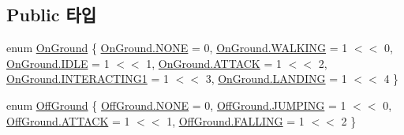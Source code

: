\subsection*{Public 타입}
\begin{DoxyCompactItemize}
\item 
enum \mbox{\hyperlink{class_state_ab9eb1c1d81f1903b8486d1275e78b68e}{On\+Ground}} \{ \newline
\mbox{\hyperlink{class_state_ab9eb1c1d81f1903b8486d1275e78b68eab50339a10e1de285ac99d4c3990b8693}{On\+Ground.\+N\+O\+NE}} = 0, 
\mbox{\hyperlink{class_state_ab9eb1c1d81f1903b8486d1275e78b68ea606c114184493a665cf1f6a12fbab9d3}{On\+Ground.\+W\+A\+L\+K\+I\+NG}} = 1 $<$$<$ 0, 
\mbox{\hyperlink{class_state_ab9eb1c1d81f1903b8486d1275e78b68eaa5daf7f2ebbba4975d61dab1c40188c7}{On\+Ground.\+I\+D\+LE}} = 1 $<$$<$ 1, 
\mbox{\hyperlink{class_state_ab9eb1c1d81f1903b8486d1275e78b68eac6ddd0f72ff2fd344693b9ca8d483871}{On\+Ground.\+A\+T\+T\+A\+CK}} = 1 $<$$<$ 2, 
\newline
\mbox{\hyperlink{class_state_ab9eb1c1d81f1903b8486d1275e78b68ea0f85e9fa4c9d9011849fd3bfcae6a2c0}{On\+Ground.\+I\+N\+T\+E\+R\+A\+C\+T\+I\+N\+G1}} = 1 $<$$<$ 3, 
\mbox{\hyperlink{class_state_ab9eb1c1d81f1903b8486d1275e78b68ea7ab0a1cfd85cc3da16cd3e3ad7448524}{On\+Ground.\+L\+A\+N\+D\+I\+NG}} = 1 $<$$<$ 4
 \}
\item 
enum \mbox{\hyperlink{class_state_a7d945e793324c017a973205564cf1a56}{Off\+Ground}} \{ \mbox{\hyperlink{class_state_a7d945e793324c017a973205564cf1a56ab50339a10e1de285ac99d4c3990b8693}{Off\+Ground.\+N\+O\+NE}} = 0, 
\mbox{\hyperlink{class_state_a7d945e793324c017a973205564cf1a56a6de49bfda8068b7bc3b0c0e3d2e43134}{Off\+Ground.\+J\+U\+M\+P\+I\+NG}} = 1 $<$$<$ 0, 
\mbox{\hyperlink{class_state_a7d945e793324c017a973205564cf1a56ac6ddd0f72ff2fd344693b9ca8d483871}{Off\+Ground.\+A\+T\+T\+A\+CK}} = 1 $<$$<$ 1, 
\mbox{\hyperlink{class_state_a7d945e793324c017a973205564cf1a56a4f9d4539ac1e11a251e2afe022eba4e6}{Off\+Ground.\+F\+A\+L\+L\+I\+NG}} = 1 $<$$<$ 2
 \}
\end{DoxyCompactItemize}
